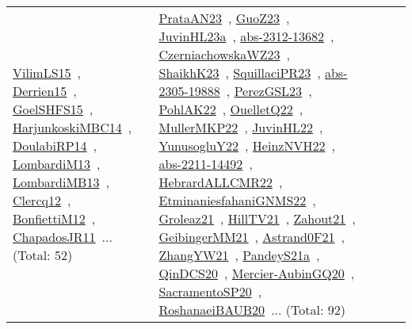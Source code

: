 {\begin{longtable}{lp{3cm}>{\raggedright\arraybackslash}p{6cm}>{\raggedright\arraybackslash}p{6cm}>{\raggedright\arraybackslash}p{8cm}}
\href{../works/VilimLS15.pdf}{VilimLS15}~\cite{VilimLS15}, \href{../works/Derrien15.pdf}{Derrien15}~\cite{Derrien15}, \href{../works/GoelSHFS15.pdf}{GoelSHFS15}~\cite{GoelSHFS15}, \href{../works/HarjunkoskiMBC14.pdf}{HarjunkoskiMBC14}~\cite{HarjunkoskiMBC14}, \href{../works/DoulabiRP14.pdf}{DoulabiRP14}~\cite{DoulabiRP14}, \href{../works/LombardiM13.pdf}{LombardiM13}~\cite{LombardiM13}, \href{../works/LombardiMB13.pdf}{LombardiMB13}~\cite{LombardiMB13}, \href{../works/Clercq12.pdf}{Clercq12}~\cite{Clercq12}, \href{../works/BonfiettiM12.pdf}{BonfiettiM12}~\cite{BonfiettiM12}, \href{../works/ChapadosJR11.pdf}{ChapadosJR11}~\cite{ChapadosJR11}... (Total: 52) & \href{../works/PrataAN23.pdf}{PrataAN23}~\cite{PrataAN23}, \href{../works/GuoZ23.pdf}{GuoZ23}~\cite{GuoZ23}, \href{../works/JuvinHL23a.pdf}{JuvinHL23a}~\cite{JuvinHL23a}, \href{../works/abs-2312-13682.pdf}{abs-2312-13682}~\cite{abs-2312-13682}, \href{../works/CzerniachowskaWZ23.pdf}{CzerniachowskaWZ23}~\cite{CzerniachowskaWZ23}, \href{../works/ShaikhK23.pdf}{ShaikhK23}~\cite{ShaikhK23}, \href{../works/SquillaciPR23.pdf}{SquillaciPR23}~\cite{SquillaciPR23}, \href{../works/abs-2305-19888.pdf}{abs-2305-19888}~\cite{abs-2305-19888}, \href{../works/PerezGSL23.pdf}{PerezGSL23}~\cite{PerezGSL23}, \href{../works/PohlAK22.pdf}{PohlAK22}~\cite{PohlAK22}, \href{../works/OuelletQ22.pdf}{OuelletQ22}~\cite{OuelletQ22}, \href{../works/MullerMKP22.pdf}{MullerMKP22}~\cite{MullerMKP22}, \href{../works/JuvinHL22.pdf}{JuvinHL22}~\cite{JuvinHL22}, \href{../works/YunusogluY22.pdf}{YunusogluY22}~\cite{YunusogluY22}, \href{../works/HeinzNVH22.pdf}{HeinzNVH22}~\cite{HeinzNVH22}, \href{../works/abs-2211-14492.pdf}{abs-2211-14492}~\cite{abs-2211-14492}, \href{../works/HebrardALLCMR22.pdf}{HebrardALLCMR22}~\cite{HebrardALLCMR22}, \href{../works/EtminaniesfahaniGNMS22.pdf}{EtminaniesfahaniGNMS22}~\cite{EtminaniesfahaniGNMS22}, \href{../works/Groleaz21.pdf}{Groleaz21}~\cite{Groleaz21}, \href{../works/HillTV21.pdf}{HillTV21}~\cite{HillTV21}, \href{../works/Zahout21.pdf}{Zahout21}~\cite{Zahout21}, \href{../works/GeibingerMM21.pdf}{GeibingerMM21}~\cite{GeibingerMM21}, \href{../works/Astrand0F21.pdf}{Astrand0F21}~\cite{Astrand0F21}, \href{../works/ZhangYW21.pdf}{ZhangYW21}~\cite{ZhangYW21}, \href{../works/PandeyS21a.pdf}{PandeyS21a}~\cite{PandeyS21a}, \href{../works/QinDCS20.pdf}{QinDCS20}~\cite{QinDCS20}, \href{../works/Mercier-AubinGQ20.pdf}{Mercier-AubinGQ20}~\cite{Mercier-AubinGQ20}, \href{../works/SacramentoSP20.pdf}{SacramentoSP20}~\cite{SacramentoSP20}, \href{../works/RoshanaeiBAUB20.pdf}{RoshanaeiBAUB20}~\cite{RoshanaeiBAUB20}... (Total: 92)\\

\end{longtable}}
